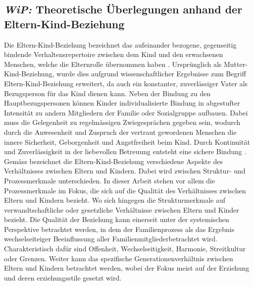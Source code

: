 \subsection{\textit{WiP:} Theoretische Überlegungen anhand der Eltern-Kind-Beziehung}\label{sec:TheretischeÜberlegungen}
Die Eltern-Kind-Beziehung bezeichnet das aufeinander bezogene, gegenseitig bindende Verhaltensrepertoire zwischen dem Kind und den erwachsenen Menschen, welche die Elternrolle übernommen haben \cite{ElternKindBeziehung1999}. Ursprünglich als Mutter-Kind-Beziehung, wurde dies aufgrund wissenschaftlicher Ergebnisse zum Begriff Eltern-Kind-Beziehung erweitert, da auch ein konstanter, zuverlässiger Vater als Bezugsperson für das Kind dienen kann. Neben der Bindung zu den Hauptbezugspersonen können Kinder individualisierte Bindung in abgestufter Intensität zu andern Mitgliedern der Familie oder Sozialgruppe aufbauen. Dabei muss die Gelegenheit zu regelmässigen Zwiegesprächen gegeben sein, wodurch durch die Anwesenheit und Zuspruch der vertraut gewordenen Menschen die innere Sicherheit, Geborgenheit und Angstfreiheit beim Kind. Durch Kontinuität und Zuverlässigkeit in der liebevollen Betreuung entsteht eine sichere Bindung \cite{ElternKindBeziehung1999}. Gemäss  bezeichnet die Eltern-Kind-Beziehung verschiedene Aspekte des Verhältnisses zwischen Eltern und Kindern. Dabei wird zwischen Struktur- und Prozessmerkmale unterschieden. In dieser Arbeit stehen vor allem die Prozessmerkmale im Fokus, die sich auf die Qualität des Verhältnisses zwischen Eltern und Kindern bezieht. Wo sich hingegen die Strukturmerkmale auf verwandtschaftliche oder gesetzliche Verhältnisse zwischen Eltern und Kinder bezieht. Die Qualität der Beziehung kann einerseit unter der systemischen Perspektive betrachtet werden, in dem der Familienprozess als das Ergebnis wechselseiteiger Beeinflussung aller Familienmitgliederbetrachtet wird. Charakteristisch dafür sind Offenheit, Wechselseitigkeit, Harmonie, Streitkultur oder Grenzen. Weiter kann das spezifische Generationenverhältnis zwischen Eltern und Kindern betrachtet werden, wobei der Fokus meist auf der Erziehung und deren erziehungsstile gesetzt wird. 

